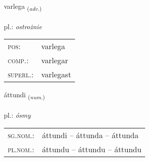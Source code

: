\documentclass[frontgrid, backgrid]{flacards}\usepackage[]{graphicx}\usepackage[]{xcolor}
\begin{document}
\renewcommand{\flhead}{\vskip5pt \fboxsep=0pt {\small\bfseries\footnotesize Atviksorð | przysłówek}}
\renewcommand{\fcfoot}{\vskip5pt \fboxsep=0pt \hspace{2pt}{\small\bfseries\footnotesize 3K}}

\renewcommand{\blhead}{\vskip5pt {\small\bfseries\footnotesize Atviksorð | przysłówek }}
\renewcommand{\bcfoot}{\vskip5pt \hspace{2pt}{\small\bfseries\footnotesize 3K}}


{varlega \small{\textsubscript{(\textit{adv.})}} \\[1ex] %
\textphonetic{[varlɛɣa]} \\
pl.: \emph{ostrożnie} \\  [2ex]
\renewcommand*{\arraystretch}{0.8}
\begin{tabular}{ll}
\textsc{pos}: & varlega \\ 
\textsc{comp.}: & varlegar \\ 
\textsc{superl.}: & varlegast \\
\end{tabular}
}

\renewcommand{\flhead}{\vskip5pt \fboxsep=0pt {\small\bfseries\footnotesize Töluorð | liczebnik}}
\renewcommand{\fcfoot}{\vskip5pt \fboxsep=0pt \hspace{2pt}{\small\bfseries\footnotesize 3K}}

\renewcommand{\blhead}{\vskip5pt {\small\bfseries\footnotesize Töluorð | liczebnik }}
\renewcommand{\bcfoot}{\vskip5pt \hspace{2pt}{\small\bfseries\footnotesize 3K}}


{áttundi \small{\textsubscript{(\textit{num.})}} \\[1ex] %
\textphonetic{[auhtʏntɪ]} \\
pl.: \emph{ósmy} \\  [2ex]
\renewcommand*{\arraystretch}{0.8}
\begin{tabular}{ll}
\textsc{sg.nom.}: & áttundi  --  áttunda -- áttunda \\ 
\textsc{pl.nom.}: & áttundu -- áttundu -- áttundu
\end{tabular}
}
\end{document}
